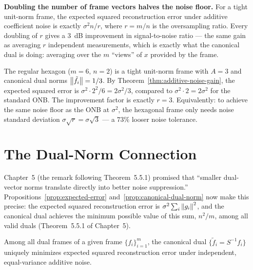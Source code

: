 \begin{keyidea}
\textbf{Doubling the number of frame vectors halves the noise floor.}
For a tight unit-norm frame, the expected squared reconstruction error
under additive coefficient noise is exactly $\sigma^2 n/r$, where
$r=m/n$ is the oversampling ratio. Every doubling of $r$ gives a
$3$~dB improvement in signal-to-noise ratio --- the same gain as
averaging $r$ independent measurements, which is exactly what the
canonical dual is doing: averaging over the $m$ ``views'' of $x$
provided by the frame.
\end{keyidea}

\begin{examplebox}[title={Example 11.1: Hexagonal frame in $\R^2$ ($m=6$, $r=3$)}]
\label{ex:hexagonal-noise}
The regular hexagon ($m=6$, $n=2$) is a tight unit-norm frame with
$A=3$ and canonical dual norms $\left\| \tilde f_i \right\|=1/3$. By
Theorem~\ref{thm:additive-noise-gain}, the expected squared error is
$\sigma^2\cdot 2^2/6 = 2\sigma^2/3$, compared to $\sigma^2\cdot 2 =
2\sigma^2$ for the standard ONB. The improvement factor is exactly
$r=3$. Equivalently: to achieve the same noise floor as the ONB at
$\sigma^2$, the hexagonal frame only needs noise standard deviation
$\sigma\sqrt{r}=\sigma\sqrt{3}$ --- a $73\%$ looser noise tolerance.
\end{examplebox}

\section{The Dual-Norm Connection}
\label{sec:dual-norm-connection}

Chapter~5 (the remark following Theorem~5.5.1) promised that ``smaller
dual-vector norms translate directly into better noise suppression.''
Propositions~\ref{prop:expected-error} and~\ref{prop:canonical-dual-norm}
now make this precise: the expected squared reconstruction error is
$\sigma^2\sum_i\left\| g_i \right\|^2$, and the canonical dual achieves the
minimum possible value of this sum, $n^2/m$, among all valid duals
(Theorem~5.5.1 of Chapter~5).

\begin{corollary}
\label{cor:canonical-optimal}
Among all dual frames of a given frame $\{f_i\}_{i=1}^m$, the canonical
dual $\{\tilde f_i = S^{-1}f_i\}$ uniquely minimizes expected squared
reconstruction error under independent, equal-variance additive noise.
\end{corollary}

